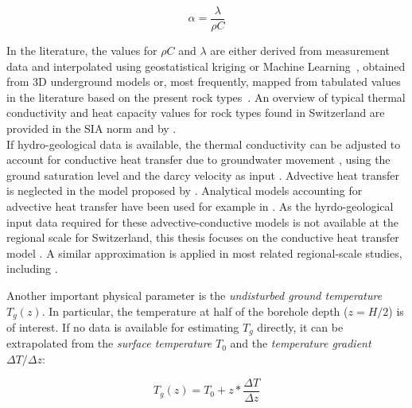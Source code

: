 \begin{equation}
    \alpha = \frac{\lambda}{\rho C}
\end{equation}

In the literature, the values for $\rho C$ and $\lambda$ are either derived from measurement data and interpolated using geostatistical kriging \cite{tian_improved_2020,munoz_estimating_2015} or Machine Learning~\cite{assouline_machine_2019}, obtained from 3D underground models \cite{garcia-gil_gis-supported_2015,groupe_de_travail_pgg_evaluation_2011} or, most frequently, mapped from tabulated values in the literature based on the present rock types~\cite{perego_techno-economic_2019,galgaro_empirical_2015,casasso_g.pot:_2016,gemelli_gis-based_2011}. An overview of typical thermal conductivity and heat capacity values for rock types found in Switzerland are provided in the SIA norm \cite{sia_sondes_2010} and by \cite{pahud_geothermal_2002}.
\\

If hydro-geological data is available, the thermal conductivity can be adjusted to account for conductive heat transfer due to groundwater movement \cite{viesi_gis-supported_2018,assouline_machine_2019}, using the ground saturation level and the darcy velocity as input \cite{viesi_gis-supported_2018}. 
Advective heat transfer is neglected in the model proposed by \citet{eskilson_thermal_1987}.
Analytical models accounting for advective heat transfer have been used for example in \cite{garcia-gil_gis-supported_2015,alcaraz_advection_2016,alcaraz_t-i-ger_2017,attard_novel_2020}.
As the hyrdo-geological input data required for these advective-conductive models is not available at the regional scale for Switzerland, this thesis focuses on the conductive heat transfer model \cite{claesson_conductive_1988}. A similar approximation is applied in most related regional-scale studies, including \cite{perego_techno-economic_2019,galgaro_empirical_2015,casasso_g.pot:_2016,rivera_increased_2017,schiel_gis-based_2016}.

Another important physical parameter is the \textit{undisturbed ground temperature} $T_g(z)$. In particular, the temperature at half of the borehole depth ($z = H/2$) is of interest. If no data is available for estimating $T_g$ directly, it can be extrapolated from the \textit{surface temperature} $T_0$ and the \textit{temperature gradient} $\Delta T/\Delta z$: 

\begin{equation}
\label{eq:Tg}
    T_g(z) = T_0 + z * \frac{\Delta T}{\Delta z}
\end{equation}

